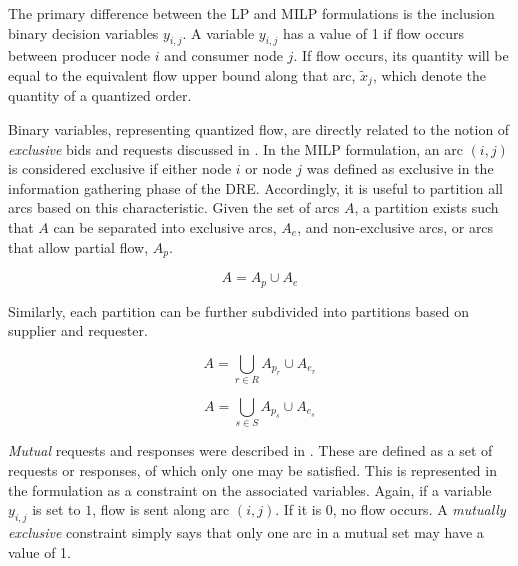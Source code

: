 
The primary difference between the LP and MILP formulations is the inclusion
binary decision variables $y_{i,j}$. A variable $y_{i,j}$ has a value of 1 if
flow occurs between producer node $i$ and consumer node $j$. If flow occurs, its
quantity will be equal to the equivalent flow upper bound along that arc,
$\tilde{x}_{j}$, which denote the quantity of a quantized order.

Binary variables, representing quantized flow, are directly related to the
notion of \textit{exclusive} bids and requests discussed in 
. In the MILP formulation, an arc $(i, j)$ is considered
exclusive if either node $i$ or node $j$ was defined as exclusive in the
information gathering phase of the DRE. Accordingly, it is useful to partition
all arcs based on this characteristic. Given the set of arcs $A$, a partition
exists such that $A$ can be separated into exclusive arcs, $A_e$, and
non-exclusive arcs, or arcs that allow partial flow, $A_p$.

\begin{equation}\label{eqs:arc-union}
  A = A_{p} \cup A_{e}
\end{equation}

Similarly, each partition can be further subdivided into partitions based on
supplier and requester. 

\begin{equation}\label{eqs:arc-union}
  A = \bigcup_{r \in R} A_{p_r} \cup A_{e_r}
\end{equation}

\begin{equation}\label{eqs:arc-union}
  A = \bigcup_{s \in S} A_{p_s} \cup A_{e_s}
\end{equation}


\textit{Mutual} requests and responses were described in 
. These are defined as a set of requests or responses, of
which only one may be satisfied. This is represented in the formulation as a
constraint on the associated variables. Again, if a variable $y_{i,j}$ is set to
$1$, flow is sent along arc $(i, j)$. If it is $0$, no flow occurs. A
\textit{mutually exclusive} constraint simply says that only one arc in a mutual
set may have a value of 1.

